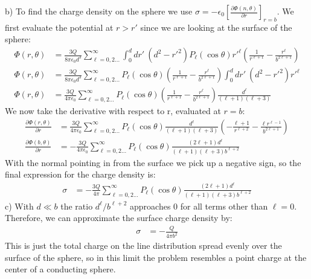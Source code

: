 \documentclass[a4paper,11pt]{article}
\numberwithin{equation}{section}
\newcommand{\ez}{\epsilon_0}
\newcommand{\lrp}[1]{\left({#1}\right)}
\begin{document}
b) To find the charge density on the sphere we use $\sigma = -\ez\left[\frac{\partial \Phi(n,\theta)}{\partial r}\right]_{r=b}$.
We first evaluate the potential at $r>r'$ since we are looking at the surface of the sphere:
\begin{align}
  \Phi(r,\theta) &= \frac{3Q}{8\pi\ez d^3}\sum_{\ell=0,2...}^\infty \int_0^d dr'\ (d^2-r'^2) P_\ell(\cos\theta)r'^\ell\lrp{\frac{1}{r^{\ell+1}}-\frac{r^\ell}{b^{2\ell+1}}}\\
  \Phi(r,\theta) &= \frac{3Q}{8\pi\ez d^3}\sum_{\ell=0,2...}^\infty P_\ell(\cos\theta)\lrp{\frac{1}{r^{\ell+1}}-\frac{r^\ell}{b^{2\ell+1}}} \int_0^d dr'\ (d^2-r'^2) r'^\ell\\
  \Phi(r,\theta) &= \frac{3Q}{4\pi\ez}\sum_{\ell=0,2...}^\infty P_\ell(\cos\theta)\lrp{\frac{1}{r^{\ell+1}}-\frac{r^\ell}{b^{2\ell+1}}} \frac{d^\ell}{(\ell+1)(\ell+3)}
\end{align}
We now take the derivative with respect to r, evaluated at $r=b$:
\begin{align}
 \frac{\partial \Phi(r,\theta)}{\partial r} &= \frac{3Q}{4\pi\ez}\sum_{\ell=0,2...}^\infty P_\ell(\cos\theta) \frac{d^\ell}{(\ell+1)(\ell+3)}\lrp{-\frac{\ell+1}{r^{\ell+2}}-\frac{\ell r^{\ell-1}}{b^{2\ell+1}}}\\
 \frac{\partial \Phi(b,\theta)}{\partial r} &= -\frac{3Q}{4\pi\ez}\sum_{\ell=0,2...}^\infty P_\ell(\cos\theta) \frac{(2\ell+1)d^\ell}{(\ell+1)(\ell+3)b^{\ell+2}}
\end{align}
With the normal pointing in from the surface we pick up a negative sign, so the final expression for the charge density is:
\begin{align}
 \sigma &= -\frac{3Q}{4\pi}\sum_{\ell=0,2...}^\infty P_\ell(\cos\theta) \frac{(2\ell+1)d^\ell}{(\ell+1)(\ell+3)b^{\ell+2}}
\end{align}
c) With $d \ll b$ the ratio $d^\ell/b^{\ell+2}$ approaches 0 for all terms other than $\ell=0$. 
Therefore, we can approximate the surface charge density by:
\begin{align}
 \sigma &= -\frac{Q}{4\pi b^2}
\end{align}
This is just the total charge on the line distribution spread evenly over the surface of the sphere, so in this limit the problem resembles a point charge at the center of a conducting sphere.
\end{document}
